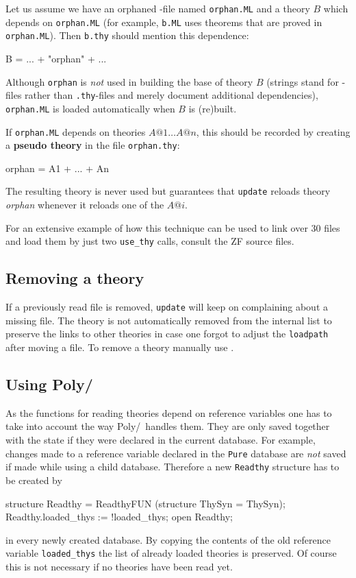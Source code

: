 Let us assume we have an orphaned \ML-file named {\tt orphan.ML} and a theory
$B$ which depends on {\tt orphan.ML} (for example, {\tt b.ML} uses theorems
that are proved in {\tt orphan.ML}). Then {\tt b.thy} should mention this
dependence:
\begin{ttbox}
B = ... + "orphan" + ...
\end{ttbox}
Although {\tt orphan} is {\em not\/} used in building the base of theory $B$
(strings stand for \ML-files rather than {\tt.thy}-files and merely document
additional dependencies), {\tt orphan.ML} is loaded automatically when $B$ is
(re)built.

If {\tt orphan.ML} depends on theories $A@1\dots A@n$, this should be recorded
by creating a {\bf pseudo theory} in the file {\tt orphan.thy}:
\begin{ttbox}
orphan = A1 + \(...\) + An
\end{ttbox}
The resulting theory is never used but guarantees that {\tt update} reloads
theory {\it orphan} whenever it reloads one of the $A@i$.

For an extensive example of how this technique can be used to link over 30
files and load them by just two {\tt use_thy} calls, consult the ZF source
files.


\subsection{Removing a theory}

If a previously read file is removed, {\tt update} will keep on complaining
about a missing file.  The theory is not automatically removed from the
internal list to preserve the links to other theories in case one forgot to
adjust the {\tt loadpath} after moving a file.  To remove a theory manually
use .  


\subsection{Using Poly/\ML}

As the functions for reading theories depend on reference variables one has
to take into account the way Poly/\ML\ handles them.  They are only saved
together with the state if they were declared in the current database.  For
example, changes made to a reference variable declared in the {\tt Pure}
database are {\em not\/} saved if made while using a child database.
Therefore a new {\tt Readthy} structure has to be created by
\begin{ttbox}
structure Readthy = ReadthyFUN (structure ThySyn = ThySyn);
Readthy.loaded_thys := !loaded_thys;
open Readthy;
\end{ttbox}
in every newly created database.  By copying the contents of the old reference
variable \verb$loaded_thys$ the list of already loaded theories is preserved.
Of course this is not necessary if no theories have been read yet.


